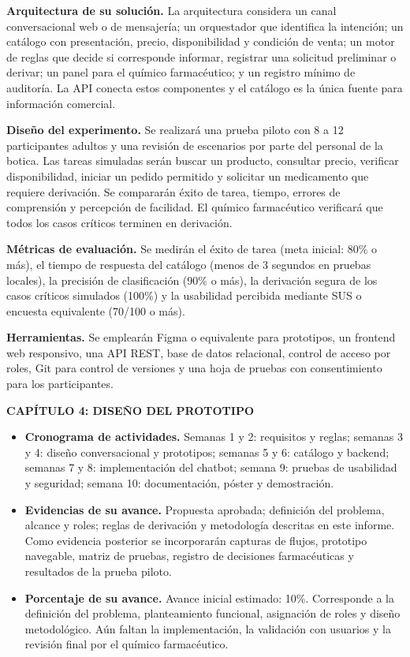 \documentclass[11pt,a4paper]{article}
\newcommand{\capitulo}[1]{\vspace{1.2em}\noindent\textbf{\large #1}\par\vspace{0.45em}}
\begin{document}
\textbf{Arquitectura de su solución.} La arquitectura considera un canal conversacional web o de mensajería; un orquestador que identifica la intención; un catálogo con presentación, precio, disponibilidad y condición de venta; un motor de reglas que decide si corresponde informar, registrar una solicitud preliminar o derivar; un panel para el químico farmacéutico; y un registro mínimo de auditoría. La API conecta estos componentes y el catálogo es la única fuente para información comercial.

\textbf{Diseño del experimento.} Se realizará una prueba piloto con 8 a 12 participantes adultos y una revisión de escenarios por parte del personal de la botica. Las tareas simuladas serán buscar un producto, consultar precio, verificar disponibilidad, iniciar un pedido permitido y solicitar un medicamento que requiere derivación. Se compararán éxito de tarea, tiempo, errores de comprensión y percepción de facilidad. El químico farmacéutico verificará que todos los casos críticos terminen en derivación.

\textbf{Métricas de evaluación.} Se medirán el éxito de tarea (meta inicial: 80\% o más), el tiempo de respuesta del catálogo (menos de 3 segundos en pruebas locales), la precisión de clasificación (90\% o más), la derivación segura de los casos críticos simulados (100\%) y la usabilidad percibida mediante SUS o encuesta equivalente (70/100 o más).

\textbf{Herramientas.} Se emplearán Figma o equivalente para prototipos, un frontend web responsivo, una API REST, base de datos relacional, control de acceso por roles, Git para control de versiones y una hoja de pruebas con consentimiento para los participantes.

\capitulo{CAPÍTULO 4: DISEÑO DEL PROTOTIPO}

\begin{itemize}[leftmargin=1.4em,itemsep=0.55em]
    \item \textbf{Cronograma de actividades.} Semanas 1 y 2: requisitos y reglas; semanas 3 y 4: diseño conversacional y prototipos; semanas 5 y 6: catálogo y backend; semanas 7 y 8: implementación del chatbot; semana 9: pruebas de usabilidad y seguridad; semana 10: documentación, póster y demostración.
    \item \textbf{Evidencias de su avance.} Propuesta aprobada; definición del problema, alcance y roles; reglas de derivación y metodología descritas en este informe. Como evidencia posterior se incorporarán capturas de flujos, prototipo navegable, matriz de pruebas, registro de decisiones farmacéuticas y resultados de la prueba piloto.
    \item \textbf{Porcentaje de su avance.} Avance inicial estimado: 10\%. Corresponde a la definición del problema, planteamiento funcional, asignación de roles y diseño metodológico. Aún faltan la implementación, la validación con usuarios y la revisión final por el químico farmacéutico.
\end{itemize}
\end{document}
